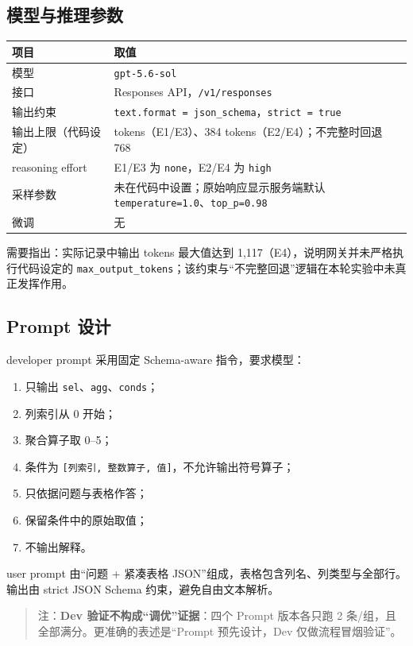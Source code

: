\documentclass[conference]{IEEEtran}
\begin{document}
\subsection{模型与推理参数}
\needspace{3.6cm}
\noindent\begin{minipage}{\linewidth}
\centering
\scriptsize
\begin{tabular}{@{}>{\raggedright\arraybackslash}p{2.84cm}>{\raggedright\arraybackslash}p{4.56cm}@{}}
\toprule
项目 & 取值 \\
\midrule
模型 & \texttt{gpt-5.6-sol} \\
接口 & Responses API，\texttt{/\allowbreak{}v1/\allowbreak{}responses} \\
输出约束 & \texttt{text.format = json\_schema}，\texttt{strict = true} \\
输出上限（代码设定） & 256 tokens（E1/E3）、384 tokens（E2/E4）；不完整时回退 768 \\
reasoning effort & E1/E3 为 \texttt{none}，E2/E4 为 \texttt{high} \\
采样参数 & 未在代码中设置；原始响应显示服务端默认 \texttt{temperature=1.0}、\texttt{top\_p=0.98} \\
微调 & 无 \\
\bottomrule
\end{tabular}
\end{minipage}\par\smallskip
需要指出：实际记录中输出 tokens 最大值达到 1,117（E4），说明网关并未严格执行代码设定的 \texttt{max\_output\_tokens}；该约束与“不完整回退”逻辑在本轮实验中未真正发挥作用。
\subsection{Prompt 设计}
developer prompt 采用固定 Schema-aware 指令，要求模型：
\begin{enumerate}
\item 只输出 \texttt{sel}、\texttt{agg}、\texttt{conds}；
\item 列索引从 0 开始；
\item 聚合算子取 0–5；
\item 条件为 \texttt{[列索引, 整数算子, 值]}，不允许输出符号算子；
\item 只依据问题与表格作答；
\item 保留条件中的原始取值；
\item 不输出解释。
\end{enumerate}
user prompt 由“问题 + 紧凑表格 JSON”组成，表格包含列名、列类型与全部行。输出由 strict JSON Schema 约束，避免自由文本解析。
\begin{quote}\small
注：\textbf{Dev 验证不构成“调优”证据}：四个 Prompt 版本各只跑 2 条/组，且全部满分。更准确的表述是“Prompt 预先设计，Dev 仅做流程冒烟验证”。
\end{quote}
\end{document}
